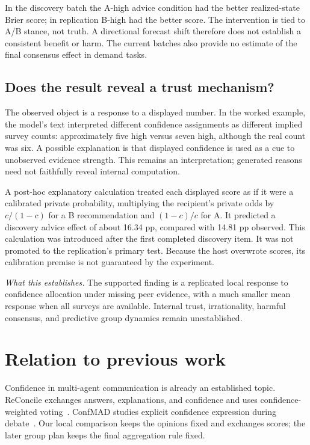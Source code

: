 \documentclass[11pt]{article}
\newcommand{\takeaway}[1]{\par\smallskip\noindent\textit{What this establishes.} #1\par\medskip}
\begin{document}
In the discovery batch the A-high advice condition had the better realized-state Brier score; in replication B-high had the better score. The intervention is tied to A/B stance, not truth. A directional forecast shift therefore does not establish a consistent benefit or harm. The current batches also provide no estimate of the final consensus effect in demand tasks.

\subsection{Does the result reveal a trust mechanism?}
The observed object is a response to a displayed number. In the worked example, the model's text interpreted different confidence assignments as different implied survey counts: approximately five high versus seven high, although the real count was six. A possible explanation is that displayed confidence is used as a cue to unobserved evidence strength. This remains an interpretation; generated reasons need not faithfully reveal internal computation.

A post-hoc explanatory calculation treated each displayed score as if it were a calibrated private probability, multiplying the recipient's private odds by $c/(1-c)$ for a B recommendation and $(1-c)/c$ for A. It predicted a discovery advice effect of about 16.34 pp, compared with 14.81 pp observed. This calculation was introduced after the first completed discovery item. It was not promoted to the replication's primary test. Because the host overwrote scores, its calibration premise is not guaranteed by the experiment.

\takeaway{The supported finding is a replicated local response to confidence allocation under missing peer evidence, with a much smaller mean response when all surveys are available. Internal trust, irrationality, harmful consensus, and predictive group dynamics remain unestablished.}

\section{Relation to previous work}
Confidence in multi-agent communication is already an established topic. ReConcile exchanges answers, explanations, and confidence and uses confidence-weighted voting~\cite{reconcile}. ConfMAD studies explicit confidence expression during debate~\cite{confmad}. Our local comparison keeps the opinions fixed and exchanges scores; the later group plan keeps the final aggregation rule fixed.
\end{document}
